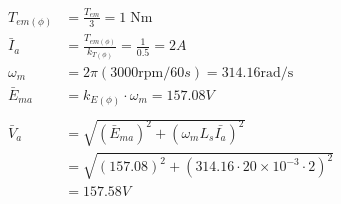 \documentclass[a4paper,11pt]{article}
\begin{document}
\begin{align*}
    T_{em(\phi)} & = \frac{T_{em}}{3} = 1\;\mathrm{Nm}                          \\ 
    \bar{I}_a    &= \frac{T_{em(\phi)}}{k_{T(\phi)}} = \frac{1}{0.5} = 2A       \\
    \omega_{m}   &= 2\pi(3000\mathrm{rpm}/60s) = 314.16 \mathrm{rad/s}          \\
    \bar{E}_{ma} &= k_{E(\phi)}{\cdot}\omega_{m} = 157.08V                      \\\\
    \bar{V}_a    &= \sqrt{(\bar{E}_{ma})^2 + (\omega_m  L_s \bar{I_a} )^2}      \\
                 &= \sqrt{(157.08)^{2}+(314.16\cdot20{\times}10^{-3}\cdot2)^{2}} \\
                 &= 157.58V
\end{align*}
\end{document}
